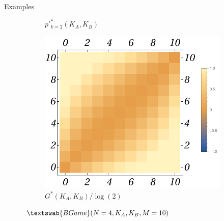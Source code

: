 \documentclass{beamer}
\theoremstyle{definition}
\newcommand{\BG}[1]{$\textswab{BGame}(#1)$}
\begin{document}
\begin{frame}[shrink=15]{Examples}
\begin{figure}[H]
\begin{subfigure}[b]{0.3\textwidth}
        \caption{\small \centering $p'^*_{k=2}(K_A,K_B)$}
        \label{fig:BGame4__10_ppk_2}
    \end{subfigure}
    \hfill %
    \begin{subfigure}[b]{0.3\textwidth}
        \includegraphics[width=\textwidth]{img/GB_Plot_4_10.pdf}
        \caption{\small \centering $G^*(K_A,K_B)/\log(2)$}
        \label{fig:BGame4__10_G}
    \end{subfigure}
    
    \caption{\small \centering \BG{N=4,K_A,K_B,M=10}}
    \label{fig:BGame4__10_PppkG}
\end{figure}
\end{frame}
\end{document}

